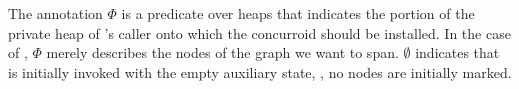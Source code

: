 The annotation $\Phi$ is a predicate over heaps that indicates the
portion of the private heap of 's caller onto which the
 concurroid should be installed. In the case of
, $\Phi$ merely describes the nodes of the graph we want to
span. $\emptyset$ indicates that  is initially invoked with
the empty auxiliary state, \ie, no nodes are initially marked.

%

%
